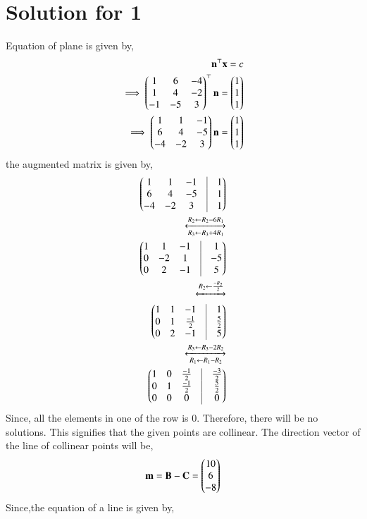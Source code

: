 \documentclass[A4,10pt,twocolumn]{IEEEtran}
\begin{document}
\section{Solution for 1}
Equation of plane is given by,
\begin{align}
\mathbf{n}^\top \mathbf{x} = c\\
\implies \begin{pmatrix}1&6&-4\\1&4&-2\\-1&-5&3\end{pmatrix}^\top \mathbf{n}=\begin{pmatrix}1\\1\\1\end{pmatrix}\\
\implies \begin{pmatrix}1&1&-1\\ 6&4&-5\\ -4&-2&3\end{pmatrix} \mathbf{n} = \begin{pmatrix}1\\1\\1\end{pmatrix}
\end{align}
the augmented matrix is given by,
\begin{align}
\myvec{1&1&-1&\vrule&1\\6&4&-5&\vrule&1\\-4&-2&3&\vrule&1}\\
\xleftrightarrow[R_3 \leftarrow R_3 + 4R_1]{R_2 \leftarrow R_2 - 6R_1}\\
\myvec{1&1&-1&\vrule&1\\0&-2&1&\vrule&-5\\0&2&-1&\vrule&5}\\
\xleftrightarrow{R_2 \leftarrow \frac{-R_2}{2}} \\ 
\myvec{1&1&-1&\vrule&1\\0&1&\frac{-1}{2}&\vrule&\frac{5}{2}\\0&2&-1&\vrule&5}\\
\xleftrightarrow[{R_1 \leftarrow R_1 - R_2}] {R_3 \leftarrow R_3 - 2R_2}\\
\myvec{1&0&\frac{-1}{2}&\vrule&\frac{-3}{2}\\0&1&\frac{-1}{2}&\vrule&\frac{5}{2}\\0&0&0&\vrule&0}\\
\end{align}
Since, all the elements in one of the row is 0. Therefore, there will be no solutions.
This signifies that the given points are collinear.
The direction vector of the line of collinear points will be,
\begin{align}
\mathbf{m}=\mathbf{B}-\mathbf{C} = \begin{pmatrix}10\\6\\-8\end{pmatrix}
\end{align}
Since,the equation of a line is given by,
\end{document}

